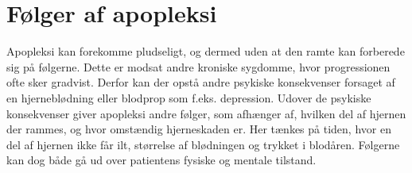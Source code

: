 \section{Følger af apopleksi }
Apopleksi kan forekomme pludseligt, og dermed uden at den ramte kan forberede sig på følgerne. Dette er modsat andre kroniske sygdomme, hvor progressionen ofte sker gradvist. Derfor kan der opstå andre psykiske konsekvenser forsaget af en hjerneblødning eller blodprop som f.eks. depression. \cite{Muus2008} Udover de psykiske konsekvenser giver apopleksi andre følger, som afhænger af, hvilken del af hjernen der rammes, og hvor omstændig hjerneskaden er. Her tænkes på tiden, hvor en del af hjernen ikke får ilt, størrelse af blødningen og trykket i blodåren\cite{Michael-Titus2010}. Følgerne kan dog både gå ud over patientens fysiske og mentale tilstand. \\

